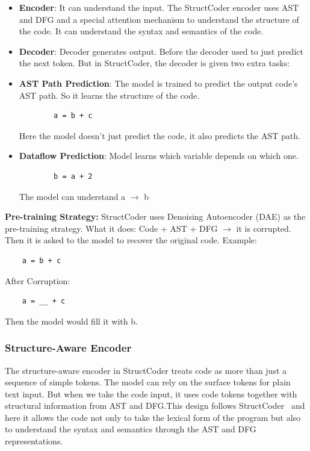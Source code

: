 \documentclass[12pt]{article}
\begin{document}
\begin{itemize}
	\item \textbf{Encoder}: It can understand the input. The StructCoder encoder uses AST and DFG and a special attention mechanism to understand the structure of the code. It can understand the syntax and semantics of the code.
	\item \textbf{Decoder}: Decoder generates output. Before the decoder used to just predict the next token. But in StructCoder, the decoder is given two extra tasks:
	\item \textbf{AST Path Prediction}: The model is trained to predict the output code's AST path. So it learns the structure of the code.
	\begin{lstlisting}
		a = b + c
	\end{lstlisting}
	Here the model doesn't just predict the code, it also predicts the AST path. 
	\item \textbf{Dataflow Prediction}: Model learns which variable depends on which one.
	\begin{lstlisting}
		b = a + 2
	\end{lstlisting}
	The model can understand a $\rightarrow$ b

\end{itemize}

\noindent\textbf{Pre-training Strategy:}
StructCoder uses Denoising Autoencoder (DAE) as the pre-training strategy. What it does:
\noindent Code + AST + DFG $\rightarrow$ it is corrupted.\\
\noindent Then it is asked to the model to recover the original code.
Example:
\begin{lstlisting}
	a = b + c
\end{lstlisting}
After Corruption:
\begin{lstlisting}
	a = __ + c
\end{lstlisting}
Then the model would fill it with b.
\subsubsection{Structure-Aware Encoder}
The structure-aware encoder in StructCoder treats code as more than just a sequence of simple tokens. The model can rely on the surface tokens for plain text input. But when we take the code input, it uses code tokens together with structural information from AST and DFG.\@ This design follows StructCoder~\cite{10.1145/3636430} and here it allows the code not only to take the lexical form of the program but also to understand the syntax and semantics through the AST and DFG representations. 
\end{document}
